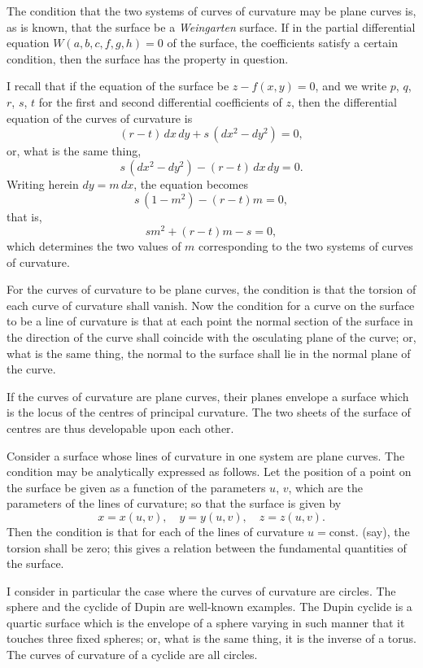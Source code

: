 \documentclass[11pt,a4paper]{book}
\begin{document}
The condition that the two systems of curves of curvature may be plane curves is, as is known, that the surface be a \textit{Weingarten} surface. If in the partial differential equation $W(a,b,c,f,g,h)=0$ of the surface, the coefficients satisfy a certain condition, then the surface has the property in question.

I recall that if the equation of the surface be $z - f(x,y) = 0$, and we write $p$, $q$, $r$, $s$, $t$ for the first and second differential coefficients of $z$, then the differential equation of the curves of curvature is
\[ (r-t)\,dx\,dy + s\,(dx^2 - dy^2) = 0, \]
or, what is the same thing,
\[ s\,(dx^2 - dy^2) - (r-t)\,dx\,dy = 0. \]
Writing herein $dy = m\,dx$, the equation becomes
\[ s\,(1-m^2) - (r-t)m = 0, \]
that is,
\[ sm^2 + (r-t)m - s = 0, \]
which determines the two values of $m$ corresponding to the two systems of curves of curvature.

For the curves of curvature to be plane curves, the condition is that the torsion of each curve of curvature shall vanish. Now the condition for a curve on the surface to be a line of curvature is that at each point the normal section of the surface in the direction of the curve shall coincide with the osculating plane of the curve; or, what is the same thing, the normal to the surface shall lie in the normal plane of the curve.

If the curves of curvature are plane curves, their planes envelope a surface which is the locus of the centres of principal curvature. The two sheets of the surface of centres are thus developable upon each other.

Consider a surface whose lines of curvature in one system are plane curves. The condition may be analytically expressed as follows. Let the position of a point on the surface be given as a function of the parameters $u$, $v$, which are the parameters of the lines of curvature; so that the surface is given by
\[ x = x(u,v),\quad y = y(u,v),\quad z = z(u,v). \]
Then the condition is that for each of the lines of curvature $u = \text{const.}$ (say), the torsion shall be zero; this gives a relation between the fundamental quantities of the surface.

I consider in particular the case where the curves of curvature are circles. The sphere and the cyclide of Dupin are well-known examples. The Dupin cyclide is a quartic surface which is the envelope of a sphere varying in such manner that it touches three fixed spheres; or, what is the same thing, it is the inverse of a torus. The curves of curvature of a cyclide are all circles.
\end{document}
